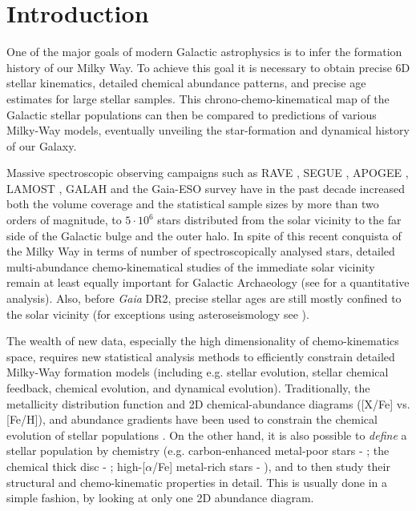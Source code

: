 \documentclass{aa}  %
\begin{document}
\section{Introduction}

One of the major goals of modern Galactic astrophysics is to infer the formation history of our Milky Way. To achieve this goal it is necessary to obtain precise 6D stellar kinematics, detailed chemical abundance patterns, and precise age estimates for large stellar samples. This chrono-chemo-kinematical map of the Galactic stellar populations can then be compared to predictions of various Milky-Way models, eventually unveiling the star-formation and dynamical history of our Galaxy. 

Massive spectroscopic observing campaigns such as RAVE \citep{Steinmetz2006}, SEGUE \citep{Yanny2009}, APOGEE \citep{Majewski2017}, LAMOST \citep{Deng2012}, GALAH \citep{Martell2017} and the Gaia-ESO survey \citep{Gilmore2012} have in the past decade increased both the volume coverage and the statistical sample sizes by more than two orders of magnitude, to $5\cdot10^6$ stars distributed from the solar vicinity to the far side of the Galactic bulge and the outer halo. 
In spite of this recent conquista of the Milky Way in terms of number of spectroscopically analysed stars, detailed multi-abundance chemo-kinematical studies of the immediate solar vicinity \citep[e.g.]{Edvardsson1993, Fuhrmann1998, Fuhrmann2011, Fuhrmann2017, Adibekyan2012, Bensby2014, Nissen2015, Nissen2016, DelgadoMena2017} remain at least equally important for Galactic Archaeology (see \citealt{Lindegren2013} for a quantitative analysis). Also, before {\it Gaia} DR2, precise stellar ages are still mostly confined to the solar vicinity (for exceptions using asteroseismology see \citealt{Casagrande2016, Anders2017, Rodrigues2017, Miglio2017}).

The wealth of new data, especially the high dimensionality of chemo-kinematics space, requires new statistical analysis methods to efficiently constrain detailed Milky-Way formation models (including e.g. stellar evolution, stellar chemical feedback, chemical evolution, and dynamical evolution). Traditionally, the metallicity distribution function and 2D chemical-abundance diagrams ([X/Fe] vs. [Fe/H]), and abundance gradients have been used to constrain the chemical evolution of stellar populations \citep[e.g.][]{Pagel2009}. On the other hand, it is also possible to {\it define} a stellar population by chemistry (e.g. carbon-enhanced metal-poor stars - \citealt{Beers2005}; the chemical thick disc - \citealt{Gratton1996, Fuhrmann1998}; high-[$\alpha$/Fe] metal-rich stars - \citealt{Adibekyan2011}), and to then study their structural and chemo-kinematic properties in detail. This is usually done in a simple fashion, by looking at only one 2D abundance diagram. 
\end{document}
